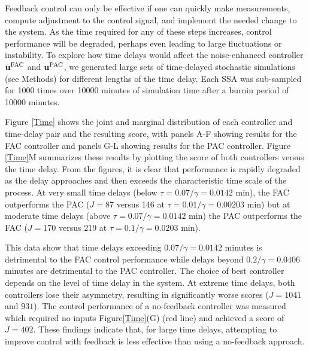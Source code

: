 \documentclass[12pt]{article}
\begin{document}
Feedback control can only be effective if one can quickly make measurements, compute adjustment to the control signal, and implement the needed change to the system. As the time required for any of these steps increases, control performance will be degraded, perhaps even leading to large fluctuations or instability. To explore how time delays would affect the noise-enhanced controller $\mathbf{u}^{\rm FAC}$ and $\mathbf{u}^{\rm PAC}$, we generated large sets of time-delayed stochastic simulations (see Methods) for different lengths of the time delay. Each SSA was sub-sampled for 1000 times over 10000 minutes of simulation time after a burnin period of 10000 minutes.

Figure \ref{Time} shows the joint and marginal distribution of each controller and time-delay pair and the resulting score, with panels A-F showing results for the FAC controller and panels G-L showing results for the PAC controller. Figure \ref{Time}M summarizes these results by plotting the score of both controllers versus the time delay. From the figures, it is clear that performance is rapidly degraded as the delay approaches and then exceeds the characteristic time scale of the process. At very small time delays (below $\tau = 0.07/\gamma = 0.0142$ min), the FAC outperforms the PAC ($J=$87 versus 146 at $\tau = 0.01/\gamma = 0.00203$ min) but at moderate time delays (above $\tau = 0.07/\gamma = 0.0142$ min) the PAC outperforms the FAC ($J=$170 versus 219 at $\tau = 0.1/\gamma = 0.0203$ min). 

This data show that time delays exceeding $0.07 / \gamma = 0.0142$ minutes is detrimental to the FAC control performance while delays beyond $0.2 / \gamma = 0.0406$ minutes are detrimental to the PAC controller. The choice of best controller depends on the level of time delay in the system. At extreme time delays, both controllers lose their asymmetry, resulting in significantly worse scores ($J = 1041$ and $931$). The control performance of a no-feedback controller was measured which required no inputs Figure\ref{Time}(G) (red line) and achieved a score of $J = 402$. These findings indicate that, for large time delays, attempting to improve control with feedback is less effective than using a no-feedback approach.

\end{document}
